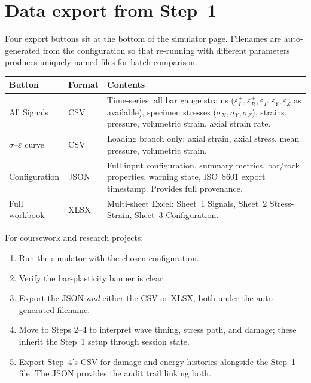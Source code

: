 \documentclass[11pt,a4paper,openany]{book}
\theoremstyle{handbook}
\newcommand{\sig}{\sigma}
\newcommand{\eps}{\varepsilon}
\begin{document}
\section{Data export from Step~1}

Four export buttons sit at the bottom of the simulator page. Filenames are
auto-generated from the configuration so that re-running with different
parameters produces uniquely-named files for batch comparison.

\begin{center}
\renewcommand{\arraystretch}{1.4}
\small
\begin{tabular}{@{}p{3.4cm}p{2cm}p{8.5cm}@{}}
\toprule
\textbf{Button} & \textbf{Format} & \textbf{Contents} \\
\midrule
All Signals & CSV &
  Time-series: all bar gauge strains
  ($\eps_I^{\pm},\eps_R^{\pm},\eps_T,\eps_Y,\eps_Z$ as available),
  specimen stresses ($\sig_X,\sig_Y,\sig_Z$), strains, pressure,
  volumetric strain, axial strain rate. \\
$\sig$--$\eps$ curve & CSV &
  Loading branch only: axial strain, axial stress, mean pressure,
  volumetric strain. \\
Configuration & JSON &
  Full input configuration, summary metrics, bar/rock properties,
  warning state, ISO~8601 export timestamp. Provides full provenance. \\
Full workbook & XLSX &
  Multi-sheet Excel: Sheet~1 Signals, Sheet~2 Stress-Strain,
  Sheet~3 Configuration. \\
\bottomrule
\end{tabular}
\end{center}

\begin{conceptbox}
For coursework and research projects:
\begin{enumerate}[leftmargin=2em,itemsep=2pt]
  \item Run the simulator with the chosen configuration.
  \item Verify the bar-plasticity banner is clear.
  \item Export the JSON \emph{and} either the CSV or XLSX, both under the
        auto-generated filename.
  \item Move to Steps 2--4 to interpret wave timing, stress path, and
        damage; these inherit the Step~1 setup through session state.
  \item Export Step~4's CSV for damage and energy histories alongside the
        Step~1 file. The JSON provides the audit trail linking both.
\end{enumerate}
\end{conceptbox}
\end{document}
